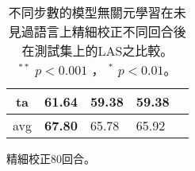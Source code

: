\begin{table}[htbp]
\begin{subtable}[h]{0.8\textwidth}
\begin{tabular}[!ht]{c|llll}
                ta & \textbf{61.64} & 59.38 & 59.38 \\
                \hline
                avg & \textbf{67.80} & 65.78 & 65.92 \\
                \hline
            \end{tabular}
            \caption{精細校正80回合。}
        \end{subtable}
    \label{tab:delex_las_epoch_1}
    \caption{不同步數的模型無關元學習在未見過語言上精細校正不同回合後在測試集上的LAS之比較。\\
    ${ }^{**}$ $p < 0.001$ ， ${ }^{*}$ $p < 0.01$。}
\end{table}